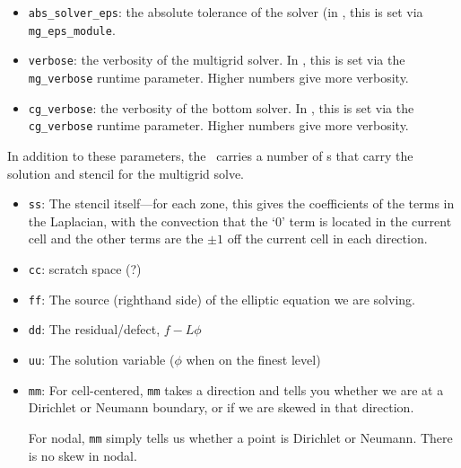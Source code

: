 \begin{itemize}
\item {\tt abs\_solver\_eps}: the absolute tolerance of the solver (in
  \maestro, this is set via {\tt mg\_eps\_module}.

\item {\tt verbose}: the verbosity of the multigrid solver.  In \maestro,
  this is set via the {\tt mg\_verbose} runtime parameter.  Higher
  numbers give more verbosity.

\item {\tt cg\_verbose}: the verbosity of the bottom solver.  In \maestro,
  this is set via the {\tt cg\_verbose} runtime parameter.  Higher
  numbers give more verbosity.

\end{itemize}

In addition to these parameters, the \mgtower\ carries a number of
\multifab s that carry the solution and stencil for the multigrid
solve.

\begin{itemize}

\item {\tt ss}: The stencil itself---for each zone, this gives the 
  coefficients of the terms in the Laplacian, with the convection that
  the `0' term is located in the current cell and the other terms are
  the $\pm 1$ off the current cell in each direction.

\item {\tt cc}: scratch space (?)

\item {\tt ff}: The source (righthand side) of the elliptic equation
  we are solving.

\item {\tt dd}: The residual/defect, $f - L\phi$

\item {\tt uu}: The solution variable ($\phi$ when on the finest level)

\item {\tt mm}: For cell-centered, {\tt mm} takes a direction and
   tells you whether we are at a Dirichlet or Neumann boundary, or if 
   we are skewed in that direction.

   For nodal, {\tt mm} simply tells us whether a point is Dirichlet
   or Neumann.  There is no skew in nodal.

\end{itemize}


\subsubsection{\bndryreg}

